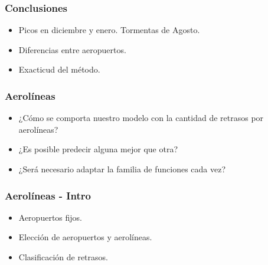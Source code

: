 \documentclass{beamer}
\begin{document}

\begin{frame}

\frametitle{Conclusiones}

\begin{itemize}
\item{Picos en diciembre y enero. Tormentas de Agosto.}
\item{Diferencias entre aeropuertos.}
\item{Exacticud del método.}
\end{itemize}

\end{frame}


\begin{frame}


\frametitle{Aerolíneas}

\begin{itemize}
    \item{¿Cómo se comporta nuestro modelo con la cantidad de retrasos por aerolíneas?}
    \item{¿Es posible predecir alguna mejor que otra?}
    \item{¿Será necesario adaptar la familia de funciones cada vez?}
\end{itemize}

\end{frame}


\begin{frame}


\frametitle{Aerolíneas - Intro}

\begin{itemize}
    \item{Aeropuertos fijos.}
    \item{Elección de aeropuertos y aerolíneas.}
    \item{Clasificación de retrasos.}
\end{itemize}

\end{frame}
\end{document}
